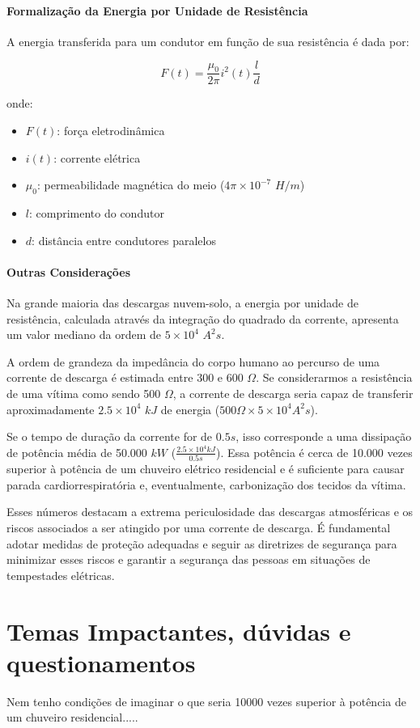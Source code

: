 \documentclass[a4paper, 12pt, onecolumn,singlespacing]{article}
\begin{document}
	\paragraph{Formalização da Energia por Unidade de Resistência} A energia transferida para um condutor em função de sua resistência é dada por:
	
	\begin{equation}
		F(t) = \frac{\mu_0}{2 \pi} i^2(t) \frac{l}{d}
	\end{equation}

	onde:
	
	\begin{itemize}
		\item $F(t)$: força eletrodinâmica
		\item $i(t)$: corrente elétrica
		\item $\mu_0$: permeabilidade magnética do meio ($4 \pi \times 10^{-7}$ $H/m$)
		\item $l$: comprimento do condutor
		\item $d$: distância entre condutores paralelos
	\end{itemize}

	\paragraph{Outras Considerações}
	Na grande maioria das descargas nuvem-solo, a energia por unidade de resistência, calculada através da integração do quadrado da corrente, apresenta um valor mediano da ordem de $5 \times 10^4$ $A^2s$.
	
	A ordem de grandeza da impedância do corpo humano ao percurso de uma corrente de descarga é estimada entre 300 e 600 $\Omega$. Se considerarmos a resistência de uma vítima como sendo 500 $\Omega$, a corrente de descarga seria capaz de transferir aproximadamente $2.5 \times 10^4$ $kJ$ de energia ($500 \Omega \times 5 \times 10^4 A^2s$).
	
	Se o tempo de duração da corrente for de $0.5 s$, isso corresponde a uma dissipação de potência média de 50.000 $kW$ ($\frac{2.5 \times 10^4 kJ}{0.5s}$). Essa potência é cerca de 10.000 vezes superior à potência de um chuveiro elétrico residencial e é suficiente para causar parada cardiorrespiratória e, eventualmente, carbonização dos tecidos da vítima.
	
	Esses números destacam a extrema periculosidade das descargas atmosféricas e os riscos associados a ser atingido por uma corrente de descarga. É fundamental adotar medidas de proteção adequadas e seguir as diretrizes de segurança para minimizar esses riscos e garantir a segurança das pessoas em situações de tempestades elétricas.
	
	\section{Temas Impactantes, dúvidas e questionamentos}
	
	Nem tenho condições de imaginar o que seria 10000 vezes superior à potência de um chuveiro residencial.....
	
\end{document}

